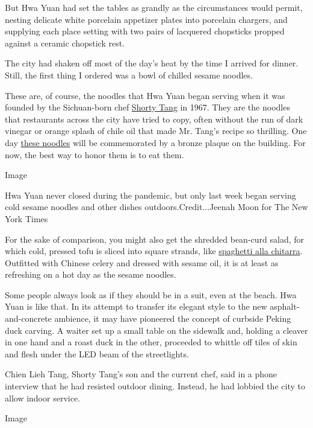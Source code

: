 But Hwa Yuan had set the tables as grandly as the circumstances would
permit, nesting delicate white porcelain appetizer plates into porcelain
chargers, and supplying each place setting with two pairs of lacquered
chopsticks propped against a ceramic chopstick rest.

The city had shaken off most of the day's heat by the time I arrived for
dinner. Still, the first thing I ordered was a bowl of chilled sesame
noodles.

These are, of course, the noodles that Hwa Yuan began serving when it
was founded by the Sichuan-born chef
\href{https://dinersjournal.blogs.nytimes.com/2010/09/30/shorty-tang-sesame-noodle-king-isremembered/}{Shorty
Tang} in 1967. They are the noodles that restaurants across the city
have tried to copy, often without the run of dark vinegar or orange
splash of chile oil that made Mr. Tang's recipe so thrilling. One day
\href{https://cooking.nytimes.com/recipes/9558-takeout-style-sesame-noodles}{these
noodles} will be commemorated by a bronze plaque on the building. For
now, the best way to honor them is to eat them.

Image

Hwa Yuan never closed during the pandemic, but only last week began
serving cold sesame noodles and other dishes outdoors.Credit...Jeenah
Moon for The New York Times

For the sake of comparison, you might also get the shredded bean-curd
salad, for which cold, pressed tofu is sliced into square strands, like
\href{https://www.nytimes.com/2004/05/26/dining/a-guitar-that-makes-beautiful-pasta.html}{spaghetti
alla chitarra}. Outfitted with Chinese celery and dressed with sesame
oil, it is at least as refreshing on a hot day as the sesame noodles.

Some people always look as if they should be in a suit, even at the
beach. Hwa Yuan is like that. In its attempt to transfer its elegant
style to the new asphalt-and-concrete ambience, it may have pioneered
the concept of curbside Peking duck carving. A waiter set up a small
table on the sidewalk and, holding a cleaver in one hand and a roast
duck in the other, proceeded to whittle off tiles of skin and flesh
under the LED beam of the streetlights.

Chien Lieh Tang, Shorty Tang's son and the current chef, said in a phone
interview that he had resisted outdoor dining. Instead, he had lobbied
the city to allow indoor service.

Image

